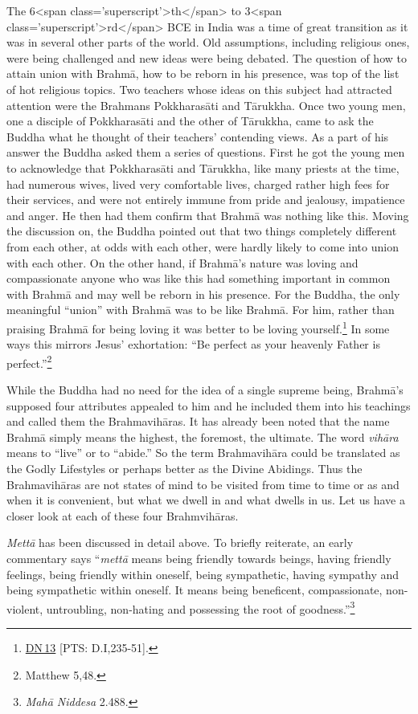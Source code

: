\documentclass[10pt, openright]{book}
\begin{document}
The 6<span class='superscript'>th</span> to 3<span class='superscript'>rd</span> BCE in India was a time of great transition as it was in several other parts of the world. Old assumptions, including religious ones, were being challenged and new ideas were being debated. The question of how to attain union with Brahmā, how to be reborn in his presence, was top of the list of hot religious topics. Two teachers whose ideas on this subject had attracted attention were the Brahmans Pokkharasāti and Tārukkha. Once two young men, one a disciple of Pokkharasāti and the other of Tārukkha, came to ask the Buddha what he thought of their teachers’ contending views. As a part of his answer the Buddha asked them a series of questions. First he got the young men to acknowledge that Pokkharasāti and Tārukkha, like many priests at the time, had numerous wives, lived very comfortable lives, charged rather high fees for their services, and were not entirely immune from pride and jealousy, impatience and anger. He then had them confirm that Brahmā was nothing like this. Moving the discussion on, the Buddha pointed out that two things completely different from each other, at odds with each other, were hardly likely to come into union with each other. On the other hand, if Brahmā’s nature was loving and compassionate anyone who was like this had something important in common with Brahmā and may well be reborn in his presence. For the Buddha, the only meaningful “union” with Brahmā was to be like Brahmā. For him, rather than praising Brahmā for being loving it was better to be loving yourself.\footnote {\href{https://suttacentral.net/dn13/en/sujato}{DN 13} [PTS: D.I,235-51].} In some ways this mirrors Jesus’ exhortation: “Be perfect as your heavenly Father is perfect.”\footnote {Matthew 5,48.}


While the Buddha had no need for the idea of a single supreme being, Brahmā’s supposed four attributes appealed to him and he included them into his teachings and called them the Brahmavihāras. It has already been noted that the name Brahmā simply means the highest, the foremost, the ultimate. The word \textit{vihāra} means to “live” or to “abide.” So the term Brahmavihāra could be translated as the Godly Lifestyles or perhaps better as the Divine Abidings. Thus the Brahmavihāras are not states of mind to be visited from time to time or as and when it is convenient, but what we dwell in and what dwells in us. Let us have a closer look at each of these four Brahmvihāras.


\textit{Mettā} has been discussed in detail above. To briefly reiterate, an early commentary says “\textit{mettā} means being friendly towards beings, having friendly feelings, being friendly within oneself, being sympathetic, having sympathy and being sympathetic within oneself. It means being beneficent, compassionate, non-violent, untroubling, non-hating and possessing the root of goodness.”\footnote {\textit{Mahā Niddesa} 2.488.}
\end{document}
